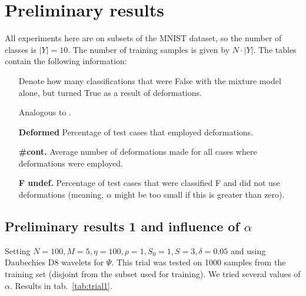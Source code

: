 \documentclass{report}
\begin{document}
\section{Preliminary results}
All experiments here are on subsets of the MNIST dataset, so the number of classes is $|Y| = 10$. The number of training samples is given by $N \cdot |Y|$. The tables contain the following information:
\begin{itemize}
    \item[\textbf{\FT}] Denote how many classifications that were False with the mixture model alone, but turned True as a result of deformations.
    \item[\textbf{\TF}] Analogous to \FT.
    \item[\textbf{Deformed}] Percentage of test cases that employed deformations. 
    \item[\textbf{\#cont.}] Average number of deformations made for all cases where deformations were employed.
    \item[\textbf{F undef.}] Percentage of test cases that were classified F and did not use deformations (meaning, $\alpha$ might be too small if this is greater than zero).
\end{itemize}

\subsection{Preliminary results 1 and influence of $\alpha$}
Setting $N=100, M=5, \eta=100, \rho=1, S_0=1, S=3, \delta=0.05$ and using Daubechies D8 wavelets for $\Psi$. This trial was tested on 1000 samples from the training set (disjoint from the subset used for training). We tried several values of $\alpha$. Results in tab.~\ref{tab:trial1}.
\end{document}
